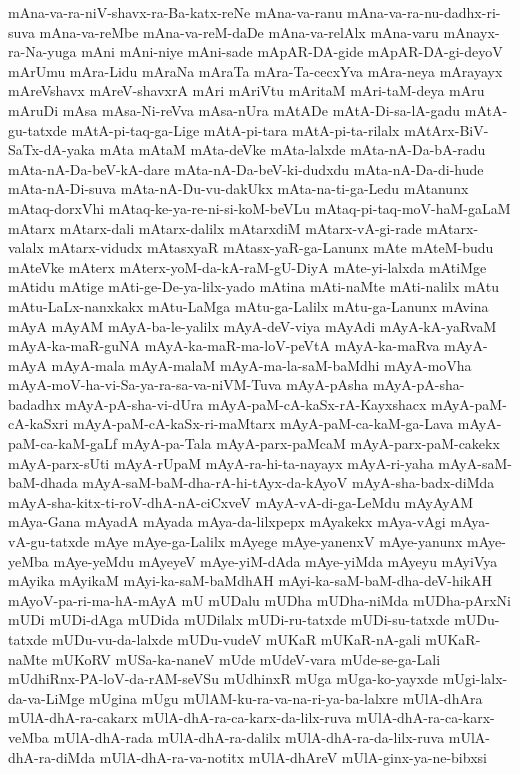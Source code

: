 {mAna-va-ra-niV-shavx-ra-Ba-katx-reNe
mAna-va-ranu
mAna-va-ra-nu-dadhx-ri-suva
mAna-va-reMbe
mAna-va-reM-daDe
mAna-va-relAlx
mAna-varu
mAnayx-ra-Na-yuga
mAni
mAni-niye
mAni-sade
mApAR-DA-gide
mApAR-DA-gi-deyoV
mArUmu
mAra-Lidu
mAraNa
mAraTa
mAra-Ta-cecxYva
mAra-neya
mArayayx
mAreVshavx
mAreV-shavxrA
mAri
mAriVtu
mAritaM
mAri-taM-deya
mAru
mAruDi
mAsa
mAsa-Ni-reVva
mAsa-nUra
mAtADe
mAtA-Di-sa-lA-gadu
mAtA-gu-tatxde
mAtA-pi-taq-ga-Lige
mAtA-pi-tara
mAtA-pi-ta-rilalx
mAtArx-BiV-SaTx-dA-yaka
mAta
mAtaM
mAta-deVke
mAta-lalxde
mAta-nA-Da-bA-radu
mAta-nA-Da-beV-kA-dare
mAta-nA-Da-beV-ki-dudxdu
mAta-nA-Da-di-hude
mAta-nA-Di-suva
mAta-nA-Du-vu-dakUkx
mAta-na-ti-ga-Ledu
mAtanunx
mAtaq-dorxVhi
mAtaq-ke-ya-re-ni-si-koM-beVLu
mAtaq-pi-taq-moV-haM-gaLaM
mAtarx
mAtarx-dali
mAtarx-dalilx
mAtarxdiM
mAtarx-vA-gi-rade
mAtarx-valalx
mAtarx-vidudx
mAtasxyaR
mAtasx-yaR-ga-Lanunx
mAte
mAteM-budu
mAteVke
mAterx
mAterx-yoM-da-kA-raM-gU-DiyA
mAte-yi-lalxda
mAtiMge
mAtidu
mAtige
mAti-ge-De-ya-lilx-yado
mAtina
mAti-naMte
mAti-nalilx
mAtu
mAtu-LaLx-nanxkakx
mAtu-LaMga
mAtu-ga-Lalilx
mAtu-ga-Lanunx
mAvina
mAyA
mAyAM
mAyA-ba-le-yalilx
mAyA-deV-viya
mAyAdi
mAyA-kA-yaRvaM
mAyA-ka-maR-guNA
mAyA-ka-maR-ma-loV-peVtA
mAyA-ka-maRva
mAyA-mAyA
mAyA-mala
mAyA-malaM
mAyA-ma-la-saM-baMdhi
mAyA-moVha
mAyA-moV-ha-vi-Sa-ya-ra-sa-va-niVM-Tuva
mAyA-pAsha
mAyA-pA-sha-badadhx
mAyA-pA-sha-vi-dUra
mAyA-paM-cA-kaSx-rA-Kayxshacx
mAyA-paM-cA-kaSxri
mAyA-paM-cA-kaSx-ri-maMtarx
mAyA-paM-ca-kaM-ga-Lava
mAyA-paM-ca-kaM-gaLf
mAyA-pa-Tala
mAyA-parx-paMcaM
mAyA-parx-paM-cakekx
mAyA-parx-sUti
mAyA-rUpaM
mAyA-ra-hi-ta-nayayx
mAyA-ri-yaha
mAyA-saM-baM-dhada
mAyA-saM-baM-dha-rA-hi-tAyx-da-kAyoV
mAyA-sha-badx-diMda
mAyA-sha-kitx-ti-roV-dhA-nA-ciCxveV
mAyA-vA-di-ga-LeMdu
mAyAyAM
mAya-Gana
mAyadA
mAyada
mAya-da-lilxpepx
mAyakekx
mAya-vAgi
mAya-vA-gu-tatxde
mAye
mAye-ga-Lalilx
mAyege
mAye-yanenxV
mAye-yanunx
mAye-yeMba
mAye-yeMdu
mAyeyeV
mAye-yiM-dAda
mAye-yiMda
mAyeyu
mAyiVya
mAyika
mAyikaM
mAyi-ka-saM-baMdhAH
mAyi-ka-saM-baM-dha-deV-hikAH
mAyoV-pa-ri-ma-hA-mAyA
mU
mUDalu
mUDha
mUDha-niMda
mUDha-pArxNi
mUDi
mUDi-dAga
mUDida
mUDilalx
mUDi-ru-tatxde
mUDi-su-tatxde
mUDu-tatxde
mUDu-vu-da-lalxde
mUDu-vudeV
mUKaR
mUKaR-nA-gali
mUKaR-naMte
mUKoRV
mUSa-ka-naneV
mUde
mUdeV-vara
mUde-se-ga-Lali
mUdhiRnx-PA-loV-da-rAM-seVSu
mUdhinxR
mUga
mUga-ko-yayxde
mUgi-lalx-da-va-LiMge
mUgina
mUgu
mUlAM-ku-ra-va-na-ri-ya-ba-lalxre
mUlA-dhAra
mUlA-dhA-ra-cakarx
mUlA-dhA-ra-ca-karx-da-lilx-ruva
mUlA-dhA-ra-ca-karx-veMba
mUlA-dhA-rada
mUlA-dhA-ra-dalilx
mUlA-dhA-ra-da-lilx-ruva
mUlA-dhA-ra-diMda
mUlA-dhA-ra-va-notitx
mUlA-dhAreV
mUlA-ginx-ya-ne-bibxsi
}
